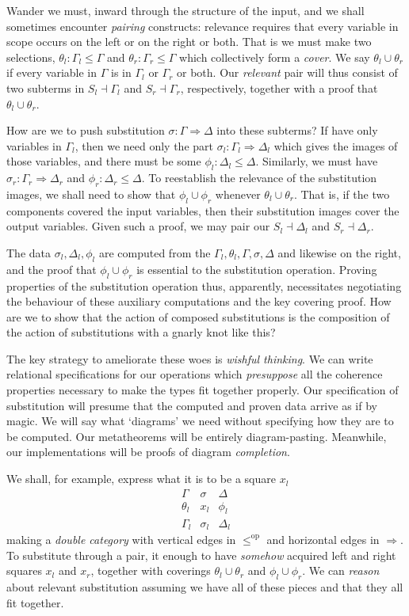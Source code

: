 \documentclass[orivec]{jfp}
\newcommand{\thin}{\le}
\newcommand{\sbst}{\Rightarrow}
\newcommand{\term}{\dashv}
\newcommand{\cover}{\cup}
\begin{document}
Wander we must, inward through the structure of the input, and we shall sometimes encounter \emph{pairing} constructs: relevance requires that every variable in scope occurs on the left or on the right or both. That is we must make two selections, $\theta_l : \Gamma_l\thin\Gamma$ and $\theta_r : \Gamma_r\thin\Gamma$ which collectively form a \emph{cover}. We say $\theta_l\cover\theta_r$ if every variable in $\Gamma$ is in $\Gamma_l$ or $\Gamma_r$ or both. Our \emph{relevant} pair will thus consist of two subterms in $S_l\term\Gamma_l$ and $S_r\term\Gamma_r$, respectively, together with a proof that $\theta_l\cover\theta_r$.

How are we to push substitution $\sigma:\Gamma\sbst\Delta$ into these subterms? If have only variables in $\Gamma_l$, then we need only the part $\sigma_l : \Gamma_l\sbst\Delta_l$ which gives the images of those variables, and there must be some $\phi_l : \Delta_l\thin\Delta$. Similarly, we must have $\sigma_r : \Gamma_r\sbst\Delta_r$ and $\phi_r:\Delta_r\thin\Delta$. To reestablish the relevance of the substitution images, we shall need to show that $\phi_l\cover\phi_r$ whenever $\theta_l\cover\theta_r$. That is, if the two components covered the input variables, then their substitution images cover the output variables. Given such a proof, we may pair our $S_l\term\Delta_l$ and $S_r\term\Delta_r$.

The data $\sigma_l,\Delta_l,\phi_l$ are computed from the $\Gamma_l,\theta_l,\Gamma,\sigma,\Delta$ and likewise on the right, and the proof that $\phi_l\cover\phi_r$ is essential to the substitution operation. Proving properties of the substitution operation thus, apparently, necessitates negotiating the behaviour of these auxiliary computations and the key covering proof. How are we to show that the action of composed substitutions is the composition of the action of substitutions with a gnarly knot like this?

The key strategy to ameliorate these woes is \emph{wishful thinking}. We can write relational specifications for our operations which \emph{presuppose} all the coherence properties necessary to make the types fit together properly. Our specification of substitution will presume that the computed and proven data arrive as if by magic. We will say what `diagrams' we need without specifying how they are to be computed. Our metatheorems will be entirely diagram-pasting. Meanwhile, our implementations will be proofs of diagram \emph{completion}.

We shall, for example, express what it is to be a square $x_l$
\[\begin{array}{ccc}
\Gamma & \sigma & \Delta \\
\theta_l & x_l & \phi_l \\
\Gamma_l & \sigma_l & \Delta_l
\end{array}\]
making a \emph{double category} with vertical edges in $\thin^{\mbox{op}}$ and horizontal edges in $\sbst$. To substitute through a pair, it enough to have \emph{somehow} acquired left and right squares $x_l$ and $x_r$, together with coverings $\theta_l\cover\theta_r$ and $\phi_l\cover\phi_r$. We can \emph{reason} about relevant substitution assuming we have all of these pieces and that they all fit together.
\end{document}
